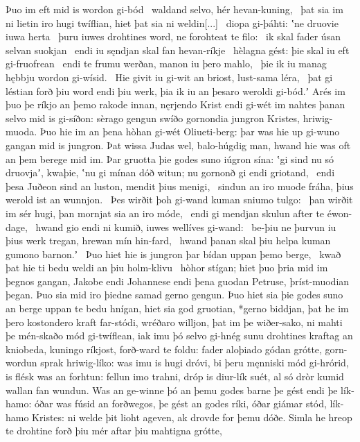 Þuo im eft mid is wordon gi-bód \hld\ waldand selvo,
hér hevan-kuning, \hld\ þat sia im ni lietin iro hugi twíflian,
hiet þat sia ni weldin[...] \hld\ diopa gi-þáhti:
ʽne druovie iuwa herta \hld\ þuru iuwes drohtines word,
ne forohteat te filo: \hld\ ik skal fader úsan
selvan suokjan \hld\ endi iu sęndjan skal
fan hevan-ríkje \hld\ hèlagna gést:
þie skal iu eft gi-fruofrean \hld\ endi te frumu werðan,
manon iu þero mahlo, \hld\ þie ik iu manag hębbju
wordon gi-wísid. \hld\ Hie givit iu gi-wit an briost,
lust-sama léra, \hld\ þat gi léstian forð
þiu word endi þiu werk, þia ik iu an þesaro weroldi gi-bód.ʼ
Arés im þuo þe ríkjo an þemo rakode innan,
nęrjendo Krist endi gi-wét im nahtes þanan
selvo mid is gi-síðon: sèrago gengun
swíðo gornondia jungron Kristes,
hriwig-muoda. Þuo hie im an þena hòhan gi-wét
Oliueti-berg: þar was hie up gi-wuno
gangan mid is jungron. Þat wissa Judas wel,
balo-húgdig man, hwand hie was oft an þem berege mid im.
Þar gruotta þie godes suno iúgron sína:
ʽgi sind nu só druovjaʼ, kwaþie, ʽnu gi mínan dóð witun;
nu gornonð gi endi griotand, \hld\ endi þesa Juðeon sind an luston,
mendit þius menigi, \hld\ sindun an iro muode fráha,
þius werold ist an wunnjon. \hld\ Þes wirðit þoh gi-wand kuman
sniumo tulgo: \hld\ þan wirðit im sér hugi,
þan mornjat sia an iro móde, \hld\ endi gi mendjan skulun
after te éwon-dage, \hld\ hwand gio endi ni kumið,
iuwes wellíves gi-wand: \hld\ be-þiu ne þurvun iu þius werk tregan,
hrewan mín hin-fard, \hld\ hwand þanan skal þiu helpa kuman
gumono barnon.ʼ \hld\ Þuo hiet hie is jungron þar
bídan uppan þemo berge, \hld\ kwað þat hie ti bedu weldi
an þiu holm-klivu \hld\ hòhor stígan;
hiet þuo þria mid im þegnos gangan,
Jakobe endi Johannese endi þena guodan Petruse,
þríst-muodian þegan. Þuo sia mid iro þiedne samad
gerno gengun. Þuo hiet sia þie godes suno
an berge uppan te bedu hnígan,
hiet sia god gruotian, *gerno biddjan,
þat he im þero kostondero kraft far-stódi,
wréðaro willjon, þat im þe wiðer-sako,
ni mahti þe mén-skaðo mód gi-twíflean,
iak imu þó selvo gi-hnég sunu drohtines
kraftag an kniobeda, kuningo ríkjost,
forð-ward te foldu: fader aloþiado
gódan grótte, gorn-wordun sprak
hriwig-líko: was imu is hugi dróvi,
bi þeru męnniski mód gi-hrórid,
is flésk was an forhtun: fellun imo trahni,
dróp is diur-lík suét, al só dròr kumid
wallan fan wundun. Was an ge-winne þó
an þemu godes barne þe gést endi þe lík-hamo:
óðar was fúsid an forðwegos,
þe gést an godes ríki, óðar giámar stód,
lík-hamo Kristes: ni welde þit lioht ageven,
ak drovde for þemu dóðe. Simla he hreop te drohtine forð
þiu mér aftar þiu mahtigna grótte,
